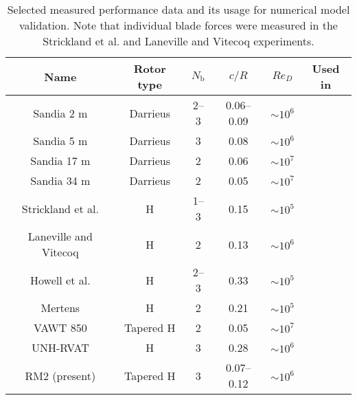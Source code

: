 \begin{table}
    \centering
    
    \begin{tabular}{c|c|c|c|c|c}
        Name & Rotor type & $N_\mathrm{b}$ & $c/R$ & $Re_D$ & Used in \\ 
        \hline
        Sandia 2 m \cite{Blackwell1976} &  Darrieus  & 2--3 & 0.06--0.09 & $\sim 10^6$ & \cite{Roh2013,Bedon2014} \\ 
        Sandia 5 m \cite{Sheldahl1977} &  Darrieus  & 3 & 0.08 & $\sim 10^6$ & \cite{Antheaume2008,Bedon2014} \\ 
        Sandia 17 m \cite{Worstell1978} & Darrieus  & 2 & 0.06 & $\sim 10^7$ & \cite{Para1988,Orlandi2015,Bedon2014} \\ 
        Sandia 34 m \cite{Ashwill1992} & Darrieus  & 2 & 0.05 & $\sim 10^7$ & \cite{Liu1992,Murray2011,Bedon2014}  \\ 
        Strickland et al. \cite{Strickland1981} & H & 1--3 & 0.15 & $\sim 10^5$ & \cite{Ponta2001,Scheurich2011b} \\ 
        Laneville and Vitecoq \cite{Laneville1986} & H & 2 & 0.13 & $\sim 10^6$ & \cite{Amet2009} \\ 
        Howell et al. \cite{Howell2010} & H & 2--3 & 0.33 & $\sim 10^5$ & \cite{Joo2015} \\ 
        Mertens \cite{Mertens2003} & H & 2 & 0.21 & $\sim 10^5$ & \cite{Orlandi2015} \\ 
        VAWT 850 \cite{Mays1990} & Tapered H & 2 & 0.05 & $\sim 10^7$ & \cite{Murray2011} \\ 
        UNH-RVAT \cite{Bachant2014-RVAT-baseline} & H & 3 & 0.28 & $\sim 10^6$ & \cite{Michelen2014} \\
        RM2 (present) & Tapered H & 3 & 0.07--0.12 & $\sim 10^6$ & 
    \end{tabular}     
    
    \caption{Selected measured performance data and its usage for numerical
        model validation. Note that individual blade forces were measured in the
        Strickland et al. and Laneville and Vitecoq experiments.}
    
    \label{tab:validation-data}
\end{table}

